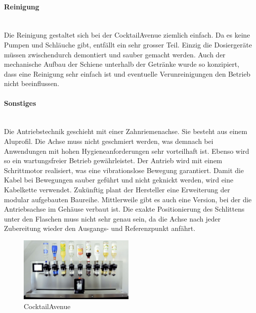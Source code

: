 \newpage

\paragraph{Reinigung}\label{subsubsec:Reinigung_CocktailAvenue}\mbox{}\\

Die Reinigung gestaltet sich bei der CocktailAvenue ziemlich einfach. Da es keine Pumpen und Schläuche gibt, entfällt ein sehr grosser Teil. Einzig die Dosiergeräte müssen zwischendurch demontiert und sauber gemacht werden. Auch der mechanische Aufbau der Schiene unterhalb der Getränke wurde so konzipiert, dass eine Reinigung sehr einfach ist und eventuelle Verunreinigungen den Betrieb nicht beeinflussen.\cite{igus_automatisiertes_nodate}

\paragraph{Sonstiges}\label{subsubsec:Sonstiges_CocktailAvenue}\mbox{}\\

Die Antriebstechnik geschieht mit einer Zahnriemenachse. Sie besteht aus einem Aluprofil. Die Achse muss nicht geschmiert werden, was demnach bei Anwendungen mit hohen Hygieneanforderungen sehr vorteilhaft ist. Ebenso wird so ein wartungsfreier Betrieb gewährleistet. Der Antrieb wird mit einem Schrittmotor realisiert, was eine vibrationslose Bewegung garantiert. Damit die Kabel bei Bewegungen sauber geführt und nicht geknickt werden, wird eine Kabelkette verwendet. Zukünftig plant der Hersteller eine Erweiterung der modular aufgebauten Baureihe. Mittlerweile gibt es auch eine Version, bei der die Antriebsachse im Gehäuse verbaut ist. Die exakte Positionierung des Schlittens unter den Flaschen muss nicht sehr genau sein, da die Achse nach jeder Zubereitung wieder den Ausgangs- und Referenzpunkt anfährt. \cite{igus_automatisiertes_nodate}

\begin{figure}[h]
	\centering
	\includegraphics[width=0.5\textwidth]{graphics/CocktailAvenue.jpg}
	\caption{CocktailAvenue \cite{igus_automatisiertes_nodate}}
	\label{fig:CocktailAvenue_Cocktailmaschine}
\end{figure}
